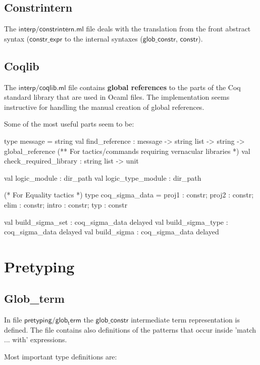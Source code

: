 \documentclass[a4paper,oneside]{book}
\newcommand{\m}[1]{\ensuremath{\mathsf{#1}}}
\begin{document}
\subsection{Constrintern}

The \m{interp/constrintern.ml} file deals with the translation from
the front abstract syntax (\m{constr\_expr} to the internal syntaxes
(\m{glob\_constr}, \m{constr}).

\subsection{Coqlib}

The \m{interp/coqlib.ml} file contains \textbf{global references} to
the parts of the Coq standard library that are used in Ocaml files.
The implementation seems instructive for handling the manual creation
of global references.

Some of the most useful parts seem to be:

\begin{code}
type message = string
val find_reference : message -> string list -> string -> global_reference
(** For tactics/commands requiring vernacular libraries *)
val check_required_library : string list -> unit

val logic_module : dir_path
val logic_type_module : dir_path

(* For Equality tactics *)
type coq_sigma_data = {
  proj1 : constr;
  proj2 : constr;
  elim  : constr;
  intro : constr;
  typ   : constr }

val build_sigma_set : coq_sigma_data delayed
val build_sigma_type : coq_sigma_data delayed
val build_sigma : coq_sigma_data delayed
\end{code}

\section{Pretyping}

\subsection{Glob\_term}

In file \m{pretyping/glob_term} the \m{glob\_constr} intermediate term
representation is defined. The file contains also definitions of
the patterns that occur inside 'match ... with' expressions.

Most important type definitions are:
\end{document}

